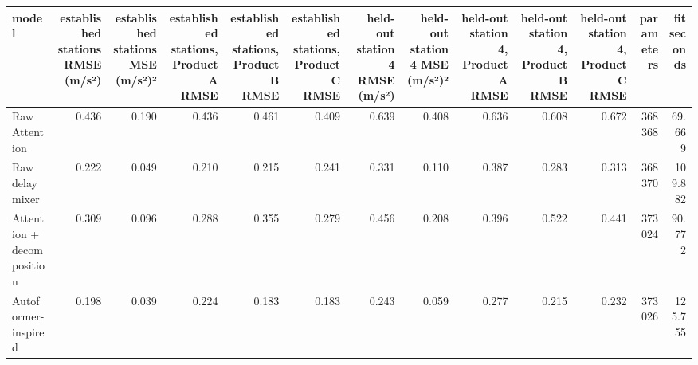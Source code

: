 \begin{tabular}{lrrrrrrrrrrrr}
\toprule
model & established stations RMSE (m/s²) & established stations MSE (m/s²)² & established stations, Product A RMSE & established stations, Product B RMSE & established stations, Product C RMSE & held-out station 4 RMSE (m/s²) & held-out station 4 MSE (m/s²)² & held-out station 4, Product A RMSE & held-out station 4, Product B RMSE & held-out station 4, Product C RMSE & parameters & fit seconds \\
\midrule
Raw Attention & 0.436 & 0.190 & 0.436 & 0.461 & 0.409 & 0.639 & 0.408 & 0.636 & 0.608 & 0.672 & 368368 & 69.669 \\
Raw delay mixer & 0.222 & 0.049 & 0.210 & 0.215 & 0.241 & 0.331 & 0.110 & 0.387 & 0.283 & 0.313 & 368370 & 109.882 \\
Attention + decomposition & 0.309 & 0.096 & 0.288 & 0.355 & 0.279 & 0.456 & 0.208 & 0.396 & 0.522 & 0.441 & 373024 & 90.772 \\
Autoformer-inspired & 0.198 & 0.039 & 0.224 & 0.183 & 0.183 & 0.243 & 0.059 & 0.277 & 0.215 & 0.232 & 373026 & 125.755 \\
\bottomrule
\end{tabular}
